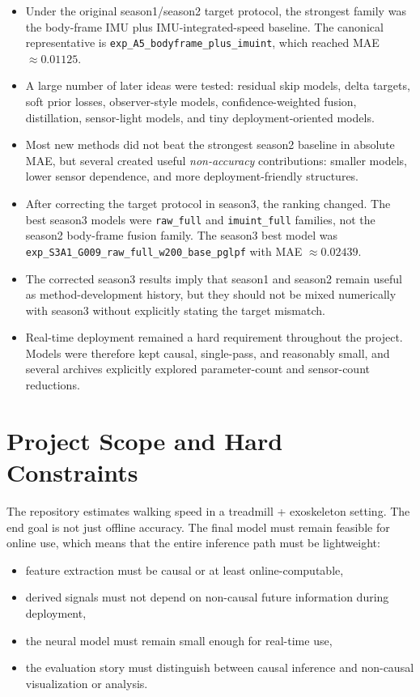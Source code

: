 \documentclass[11pt,a4paper]{article}
\begin{document}
\begin{itemize}
\item Under the original season1/season2 target protocol, the strongest family was the body-frame IMU plus IMU-integrated-speed baseline. The canonical representative is \texttt{exp\_A5\_bodyframe\_plus\_imuint}, which reached MAE \(\approx 0.01125\).
\item A large number of later ideas were tested: residual skip models, delta targets, soft prior losses, observer-style models, confidence-weighted fusion, distillation, sensor-light models, and tiny deployment-oriented models.
\item Most new methods did not beat the strongest season2 baseline in absolute MAE, but several created useful \emph{non-accuracy} contributions: smaller models, lower sensor dependence, and more deployment-friendly structures.
\item After correcting the target protocol in season3, the ranking changed. The best season3 models were \texttt{raw\_full} and \texttt{imuint\_full} families, not the season2 body-frame fusion family. The season3 best model was \texttt{exp\_S3A1\_G009\_raw\_full\_w200\_base\_pglpf} with MAE \(\approx 0.02439\).
\item The corrected season3 results imply that season1 and season2 remain useful as method-development history, but they should not be mixed numerically with season3 without explicitly stating the target mismatch.
\item Real-time deployment remained a hard requirement throughout the project. Models were therefore kept causal, single-pass, and reasonably small, and several archives explicitly explored parameter-count and sensor-count reductions.
\end{itemize}

\section{Project Scope and Hard Constraints}

The repository estimates walking speed in a treadmill + exoskeleton setting. The end goal is not just offline accuracy. The final model must remain feasible for online use, which means that the entire inference path must be lightweight:

\begin{itemize}
\item feature extraction must be causal or at least online-computable,
\item derived signals must not depend on non-causal future information during deployment,
\item the neural model must remain small enough for real-time use,
\item the evaluation story must distinguish between causal inference and non-causal visualization or analysis.
\end{itemize}
\end{document}
